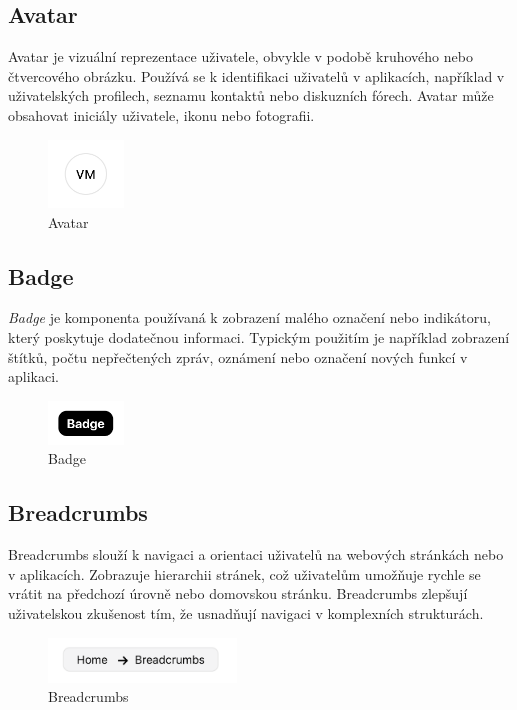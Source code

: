 \subsection{Avatar}
Avatar je vizuální reprezentace uživatele, obvykle v podobě kruhového nebo čtvercového obrázku. Používá se k identifikaci uživatelů v aplikacích, například v uživatelských profilech, seznamu kontaktů nebo diskuzních fórech. Avatar může obsahovat iniciály uživatele, ikonu nebo fotografii.

\begin{figure}[H]
  \centering
  \includegraphics[width=2cm]{images/avatar}
  \captionsetup{justification=centering,margin=2cm}
  \caption{Avatar} \label{picture:avatar}
\end{figure}

\subsection{Badge}
\emph{Badge} je komponenta používaná k zobrazení malého označení nebo indikátoru, který poskytuje dodatečnou informaci. Typickým použitím je například zobrazení štítků, počtu nepřečtených zpráv, oznámení nebo označení nových funkcí v aplikaci.

\begin{figure}[H]
  \centering
  \includegraphics[width=2cm]{images/badge}
  \captionsetup{justification=centering,margin=2cm}
  \caption{Badge} \label{picture:badge}
\end{figure}

\subsection{Breadcrumbs}
Breadcrumbs slouží k navigaci a orientaci uživatelů na webových stránkách nebo v aplikacích. Zobrazuje hierarchii stránek, což uživatelům umožňuje rychle se vrátit na předchozí úrovně nebo domovskou stránku. Breadcrumbs zlepšují uživatelskou zkušenost tím, že usnadňují navigaci v komplexních strukturách.

\begin{figure}[H]
  \centering
  \includegraphics[width=5cm]{images/breadcrumbs}
  \captionsetup{justification=centering,margin=2cm}
  \caption{Breadcrumbs} \label{picture:breadcrumbs}
\end{figure}

